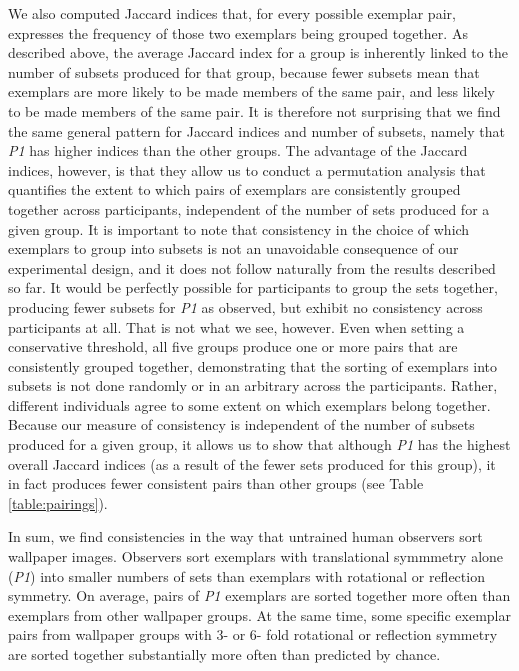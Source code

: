 \documentclass[11pt, twoside]{article}
\begin{document}
We also computed Jaccard indices that, for every possible exemplar pair, expresses the frequency of those two exemplars being grouped together. As described above, the average Jaccard index for a group is inherently linked to the number of subsets produced for that group, because fewer subsets mean that exemplars are more likely to be made members of the same pair, and less likely to be made members of the same pair. It is therefore not surprising that we find the same general pattern for Jaccard indices and number of subsets, namely that \textit{P1} has higher indices than the other groups. The advantage of the Jaccard indices, however, is that they allow us to conduct a permutation analysis that quantifies the extent to which pairs of exemplars are consistently grouped together across participants, independent of the number of sets produced for a given group. It is important to note that consistency in the choice of which exemplars to group into subsets is not an unavoidable consequence of our experimental design, and it does not follow naturally from the results described so far. It would be perfectly possible for participants to group the sets together, producing fewer subsets for \textit{P1} as observed, but exhibit no consistency across participants at all. That is not what we see, however. Even when setting a conservative threshold, all five groups produce one or more pairs that are consistently grouped together, demonstrating that the sorting of exemplars into subsets is not done randomly or in an arbitrary across the participants. Rather, different individuals agree to some extent on which exemplars belong together. Because our measure of consistency is independent of the number of subsets produced for a given group, it allows us to show that although \textit{P1} has the highest overall Jaccard indices (as a result of the fewer sets produced for this group), it in fact produces fewer consistent pairs than other groups (see Table \ref{table:pairings}).

In sum, we find consistencies in the way that untrained human observers sort wallpaper images. Observers sort exemplars with translational symmmetry alone (\textit{P1}) into smaller numbers of sets than exemplars with rotational or reflection symmetry. On average, pairs of \textit{P1} exemplars are sorted together more often than exemplars from other wallpaper groups. At the same time, some specific exemplar pairs from wallpaper groups with 3- or 6- fold rotational or reflection symmetry are sorted together substantially more often than predicted by chance. 
\end{document}
